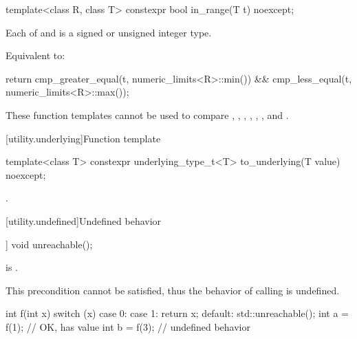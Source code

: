 %
\begin{itemdecl}
template<class R, class T>
  constexpr bool in_range(T t) noexcept;
\end{itemdecl}

\begin{itemdescr}
\pnum
\mandates
Each of  and  is
a signed or unsigned integer type.

\pnum
\effects
Equivalent to:
\begin{codeblock}
return cmp_greater_equal(t, numeric_limits<R>::min()) &&
       cmp_less_equal(t, numeric_limits<R>::max());
\end{codeblock}
\end{itemdescr}

\pnum
\begin{note}
These function templates cannot be used to compare
,
,
,
,
,
, and
.
\end{note}

[utility.underlying]{Function template }

%
\begin{itemdecl}
template<class T>
  constexpr underlying_type_t<T> to_underlying(T value) noexcept;
\end{itemdecl}

\begin{itemdescr}
\pnum
\returns
{}.
\end{itemdescr}

[utility.undefined]{Undefined behavior}

%
\begin{itemdecl}
[[noreturn]] void unreachable();
\end{itemdecl}

\begin{itemdescr}
\pnum
\expects
{} is .
\begin{note}
This precondition cannot be satisfied, thus the behavior
of calling  is undefined.
\end{note}

\pnum
\begin{example}
\begin{codeblock}
int f(int x) {
  switch (x) {
  case 0:
  case 1:
    return x;
  default:
    std::unreachable();
  }
}
int a = f(1);           // OK,  has value 
int b = f(3);           // undefined behavior
\end{codeblock}
\end{example}
\end{itemdescr}

